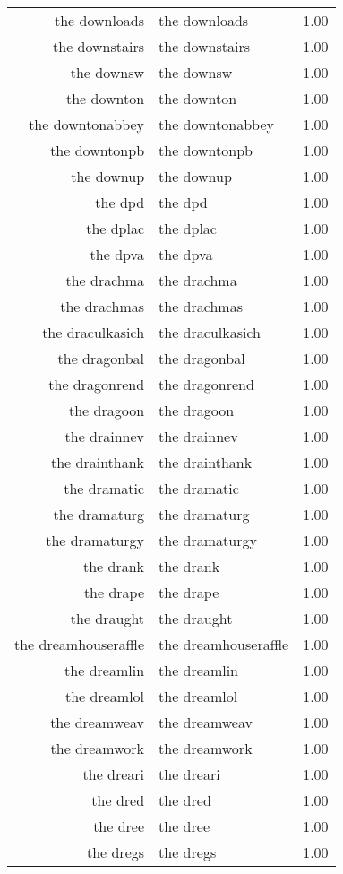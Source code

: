 \begin{table}[ht]
\begin{tabular}{rlr}
  the downloads & the downloads & 1.00 \\ 
  the downstairs & the downstairs & 1.00 \\ 
  the downsw & the downsw & 1.00 \\ 
  the downton & the downton & 1.00 \\ 
  the downtonabbey & the downtonabbey & 1.00 \\ 
  the downtonpb & the downtonpb & 1.00 \\ 
  the downup & the downup & 1.00 \\ 
  the dpd & the dpd & 1.00 \\ 
  the dplac & the dplac & 1.00 \\ 
  the dpva & the dpva & 1.00 \\ 
  the drachma & the drachma & 1.00 \\ 
  the drachmas & the drachmas & 1.00 \\ 
  the draculkasich & the draculkasich & 1.00 \\ 
  the dragonbal & the dragonbal & 1.00 \\ 
  the dragonrend & the dragonrend & 1.00 \\ 
  the dragoon & the dragoon & 1.00 \\ 
  the drainnev & the drainnev & 1.00 \\ 
  the drainthank & the drainthank & 1.00 \\ 
  the dramatic & the dramatic & 1.00 \\ 
  the dramaturg & the dramaturg & 1.00 \\ 
  the dramaturgy & the dramaturgy & 1.00 \\ 
  the drank & the drank & 1.00 \\ 
  the drape & the drape & 1.00 \\ 
  the draught & the draught & 1.00 \\ 
  the dreamhouseraffle & the dreamhouseraffle & 1.00 \\ 
  the dreamlin & the dreamlin & 1.00 \\ 
  the dreamlol & the dreamlol & 1.00 \\ 
  the dreamweav & the dreamweav & 1.00 \\ 
  the dreamwork & the dreamwork & 1.00 \\ 
  the dreari & the dreari & 1.00 \\ 
  the dred & the dred & 1.00 \\ 
  the dree & the dree & 1.00 \\ 
  the dregs & the dregs & 1.00 \\ 

\end{tabular}
\end{table}
